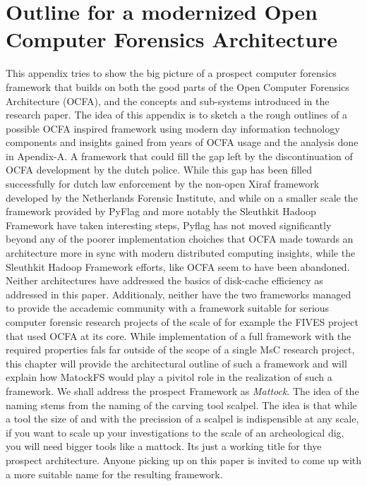 \chapter{Outline for a modernized Open Computer Forensics Architecture}
This appendix tries to show the big picture of a prospect computer forensics framework that builds on both the good parts of the Open Computer Forensics Architecture (OCFA), and the concepts and sub-systems introduced in the research paper. The idea of this appendix is to sketch a  the rough outlines of a possible OCFA inspired framework using modern day information technology components and insights gained from years of OCFA usage and the analysis done in Apendix-A. A framework that could fill the gap left by the discontinuation of OCFA development by the dutch police. While this gap has been filled successfully for dutch law enforcement by the non-open Xiraf framework developed by the Netherlands Forensic Institute, and while on a smaller scale the framework provided by PyFlag and more notably the Sleuthkit Hadoop Framework have taken interesting steps, Pyflag has not moved significantly beyond any of the poorer implementation choiches that OCFA made towards an architecture more in sync with modern distributed computing insights, while the Sleuthkit Hadoop Framework efforts, like OCFA seem to have been abandoned. Neither architectures have addressed the basics of disk-cache efficiency as addressed in this paper. Additionaly, neither have the two frameworks managed to provide the accademic community with a framework suitable for serious computer forensic research projects of the scale of for example the FIVES project that used OCFA at its core. While implementation of a full framework with the required properties fals far outside of the scope of a single MsC research project, this chapter will provide the architectural outline of such a framework and will explain how MatockFS would play a pivitol role in the realization of such a framework. We shall address the prospect Framework as \emph{Mattock}. The idea of the naming stems from the naming of the carving tool scalpel. The idea is that while a tool the size of and with the precission of a scalpel is indispensible at any scale, if you want to scale up your investigations to the scale of an archeological dig, you will need bigger tools like a mattock. Its just a working title for thye prospect architecture. Anyone picking up on this paper is invited to come up with a more suitable name for the resulting framework. 
